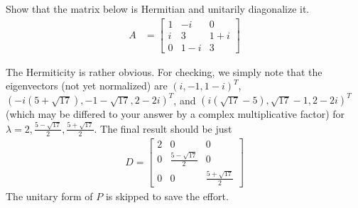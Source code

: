 \begin{Exercise}
Show that the matrix below is Hermitian and unitarily diagonalize it.
\begin{align*}
A &=
\begin{bmatrix}
1 & -i & 0 \\
i & 3 & 1+i \\
0 & 1-i & 3 
\end{bmatrix}
\end{align*}
\end{Exercise}
\begin{Answer}
The Hermiticity is rather obvious. For checking, we simply note that the eigenvectors (not yet normalized) are $(i, -1, 1-i)^T$, $(-i(5+\sqrt{17}), -1-\sqrt{17}, 2-2i)^T$, and $(i(\sqrt{17}-5), \sqrt{17}-1, 2-2i)^T$ (which may be differed to your answer by a complex multiplicative factor) for $\lambda = 2, \frac{5-\sqrt{17}}{2}, \frac{5+\sqrt{17}}{2}$. The final result should be just
\begin{align*}
D =
\begin{bmatrix}
2 & 0 & 0 \\
0 & \frac{5-\sqrt{17}}{2} & 0 \\
0 & 0 & \frac{5+\sqrt{17}}{2}
\end{bmatrix}
\end{align*}
The unitary form of $P$ is skipped to save the effort.
\end{Answer}

